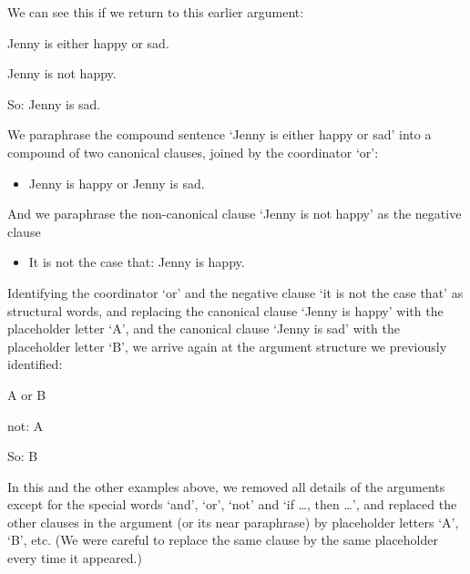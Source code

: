 We can see this if we return to this earlier argument: \begin{earg}
	\item[] Jenny is either happy or sad.
	\item[] Jenny is not happy.
	\item[So:] Jenny is sad.
\end{earg}
We paraphrase the compound sentence `Jenny is either happy or sad' into a compound of two canonical clauses, joined by the coordinator `or':
\begin{itemize}
\item Jenny is happy or Jenny is sad.
\end{itemize} 
And we paraphrase the non-canonical clause `Jenny is not happy' as the negative clause 
\begin{itemize}
	\item It is not the case that: Jenny is happy.

	\end{itemize} Identifying the coordinator `or' and the negative clause `it is not the case that' as structural words, and replacing the canonical clause `Jenny is happy' with the placeholder letter `A', and the canonical clause `Jenny is sad' with the placeholder letter `B', we arrive again at the argument structure we previously identified:
	\begin{earg}
		\item[] A \textsf{or} B
		\item[] \textsf{not}: A
		\item[So:] B
	\end{earg}

In this and the other examples above, we removed all details of the arguments except for the special words `and', `or', `not' and `if …, then …', and replaced the other clauses in the argument (or its near paraphrase) by placeholder letters `A', `B', etc. (We were careful to replace the same clause by the same placeholder every time it appeared.)

